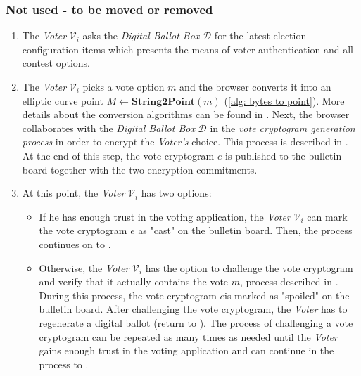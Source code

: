 \subsubsection{Not used - to be moved or removed}
\begin{enumerate}
    \item The \textit{Voter} $\mathcal{V}_i$ asks the \textit{Digital Ballot Box} $\mathcal{D}$ for the latest election configuration items which presents the means of voter authentication and all contest options.
 
    \item \label{itm: pick vote} The \textit{Voter} $\mathcal{V}_i$ picks a vote option $m$ and the browser converts it into an elliptic curve point \( M \leftarrow \mathbf{String2Point}(m) \) (\cref{alg: bytes to point}). More details about the conversion algorithms can be found in . Next, the browser collaborates with the \textit{Digital Ballot Box} $\mathcal{D}$ in the \textit{vote cryptogram generation process} in order to encrypt the \textit{Voter's} choice. This process is described in . At the end of this step, the vote cryptogram $e$ is published to the bulletin board together with the two encryption commitments.
    
    \item At this point, the \textit{Voter} $\mathcal{V}_i$ has two options:
    \begin{itemize}
        \item If he has enough trust in the voting application, the \textit{Voter} $\mathcal{V}_i$ can mark the vote cryptogram $e$ as "cast" on the bulletin board. Then, the process continues on to .
        
        \item Otherwise, the \textit{Voter} $\mathcal{V}_i$ has the option to challenge the vote cryptogram and verify that it actually contains the vote $m$, process described in . During this process, the vote cryptogram $e$is marked as "spoiled" on the bulletin board. After challenging the vote cryptogram, the \textit{Voter} has to regenerate a digital ballot (return to ). The process of challenging a vote cryptogram can be repeated as many times as needed until the \textit{Voter} gains enough trust in the voting application and can continue in the process to .
    \end{itemize}
    

\end{enumerate}
